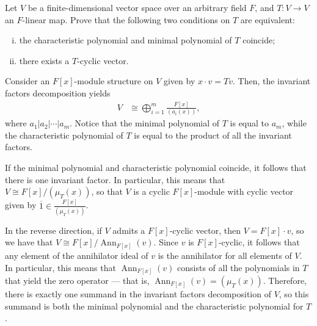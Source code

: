 \documentclass[10pt]{mypackage}
\begin{document}
\begin{solution}
\begin{enumerate}[(i)]
  \end{enumerate}
\end{solution}
\begin{problem}[Problem 5]
  Let $V$ be a finite-dimensional vector space over an arbitrary field $F$, and $T\colon V\rightarrow V$ an $F$-linear map. Prove that the following two conditions on $T$ are equivalent:
  \begin{enumerate}[(i)]
    \item the characteristic polynomial and minimal polynomial of $T$ coincide;
    \item there exists a $T$-cyclic vector.
  \end{enumerate}
\end{problem}
\begin{solution}
  Consider an $F[x]$-module structure on $V$ given by $x\cdot v = Tv$. Then, the invariant factors decomposition yields
  \begin{align*}
    V &\cong \bigoplus_{i=1}^{m} \frac{F[x]}{\left( a_i(x) \right)},
  \end{align*}
  where $a_1 | a_2 | \cdots | a_m$. Notice that the minimal polynomial of $T$ is equal to $a_m$, while the characteristic polynomial of $T$ is equal to the product of all the invariant factors.

  If the minimal polynomial and characteristic polynomial coincide, it follows that there is one invariant factor. In particular, this means that $V\cong F[x]/\left( \mu_T(x) \right)$, so that $V$ is a cyclic $F[x]$-module with cyclic vector given by $ \overline{1}\in \frac{F[x]}{\left( \mu_T(x) \right)} $.

  In the reverse direction, if $V$ admits a $F[x]$-cyclic vector, then $V = F[x]\cdot v$, so we have that $V\cong F[x]/\operatorname{Ann}_{F[x]}(v)$. Since $v$ is $F[x]$-cyclic, it follows that any element of the annihilator ideal of $v$ is the annihilator for all elements of $V$. In particular, this means that $\operatorname{Ann}_{F[x]}(v)$ consists of all the polynomials in $T$ that yield the zero operator --- that is, $\operatorname{Ann}_{F[x]}(v) = \left( \mu_T(x) \right)$. Therefore, there is exactly one summand in the invariant factors decomposition of $V$, so this summand is both the minimal polynomial and the characteristic polynomial for $T$.
\end{solution}
\end{document}
